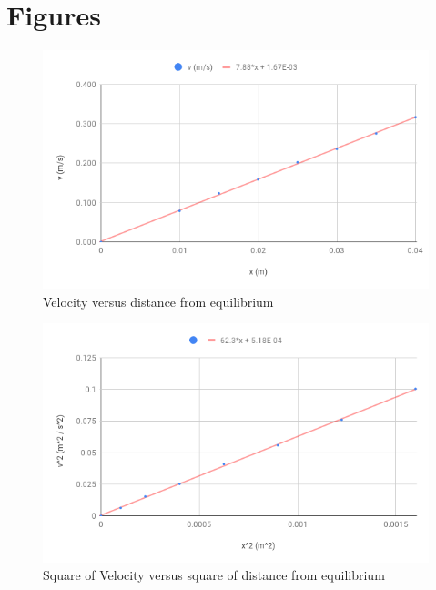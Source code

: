 \section{Figures}
%
\begin{figure}[ht]
    \centering
    \includegraphics[scale=0.71]{image/06-kinetic/v.png}
    \caption{Velocity versus distance from equilibrium}
    \label{figure:06.v}
\end{figure}
%
\begin{figure}[ht]
    \centering
    \includegraphics[scale=0.71]{image/06-kinetic/v2.png}
    \caption{Square of Velocity versus square of distance from equilibrium}
    \label{figure:06.v.2}
\end{figure}
%